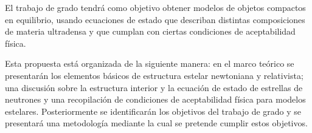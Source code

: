 El trabajo de grado tendrá como objetivo obtener modelos de objetos compactos en equilibrio, usando ecuaciones de estado que describan distintas composiciones de materia ultradensa y que cumplan con ciertas condiciones de aceptabilidad física. 

Esta propuesta está organizada de la siguiente manera: en el marco teórico se presentarán los elementos básicos de estructura estelar newtoniana y relativista; una discusión sobre la estructura interior y la ecuación de estado de estrellas de neutrones y una recopilación de condiciones de aceptabilidad física para modelos estelares. Posteriormente se identificarán los objetivos del trabajo de grado y se presentará una metodología mediante la cual se pretende cumplir estos objetivos.

